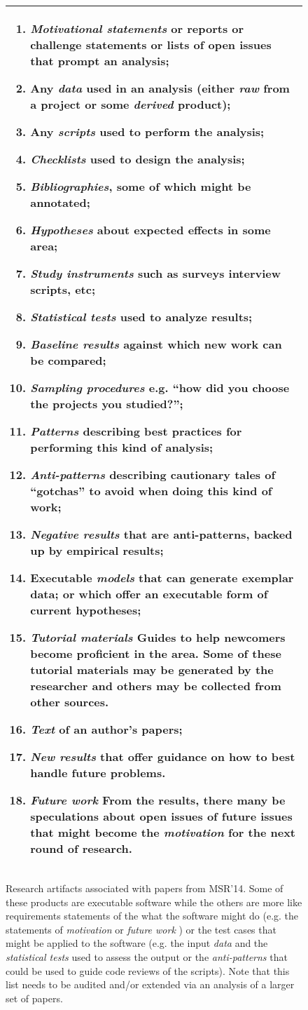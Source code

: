 \documentclass[journal]{IEEEtran}
\newcommand{\be}{\begin{enumerate}}
\newcommand{\ee}{\end{enumerate}}
\begin{document}
\begin{figure}[!t]
\begin{tabular}{|p{.95\linewidth}|}\hline
\small
\be
\item {\em Motivational statements}  or reports or challenge statements or lists of open issues that prompt an analysis;
\item  Any {\em data} used in an analysis (either {\em raw} from a project or some
      {\em derived} product);
\item Any {\em scripts} used to perform the analysis;
\item {\em Checklists} used to design the analysis;
\item {\em Bibliographies}, some of which might be annotated;
\item {\em Hypotheses} about expected effects in some area;
\item {\em Study instruments} such as surveys interview scripts, etc;
\item {\em Statistical tests} used to analyze results;

\item {\em Baseline results} against which new work can be compared;
\item {\em Sampling procedures} e.g. ``how did you choose the projects you studied?'';
\item {\em Patterns} describing  best practices for performing this kind of analysis;
\item {\em Anti-patterns}  describing cautionary tales of ``gotchas'' to avoid when doing this kind of work;
\item {\em Negative results} that are anti-patterns, backed up by empirical results;
\item Executable {\em models} that can generate exemplar data;  or which offer an executable form of current hypotheses;
\item {\em Tutorial materials} Guides to help  newcomers become proficient in the area. Some of these tutorial materials
      may be generated by the researcher
and others may be collected from other sources.
\item {\em Text} of an author's papers;
\item {\em New results}  that offer guidance on how to best handle future problems.
\item {\em Future work} From the results, there many be speculations about open issues of
      future issues that might become the {\em motivation} for the
      next round of research.
\ee
\\\hline
\end{tabular}
\caption{
Research artifacts associated with papers from MSR'14. Some of these products are executable software while the others are more like requirements statements of the what the software might do (e.g. the statements of {\em motivation} or {\em future work} ) 
or the test cases that might be applied to the software (e.g. the input {\em data} and the  {\em statistical tests} used to assess the output or the 
{\em anti-patterns} that could be used to guide code reviews of the scripts).
Note that this list needs to be audited and/or extended via an analysis of a larger set of papers.}\label{fig:types}
\end{figure} 
 
\end{document}
